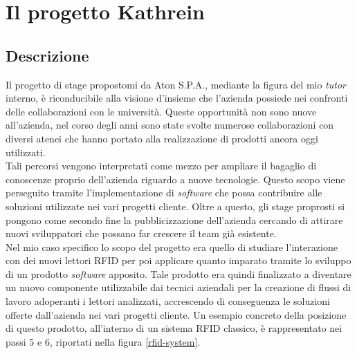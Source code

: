 
\chapter{Il progetto Kathrein}
\label{cap:lo-stage}


\section{Descrizione}
\label{sec:descrizione}
Il progetto di stage propostomi da Aton S.P.A., mediante la figura del mio \emph{tutor} interno, è riconducibile alla visione d'insieme che l'azienda possiede
nei confronti delle collaborazioni con le università. Queste opportunità non sono nuove all'azienda, nel corso degli anni sono state svolte
numerose collaborazioni con diversi atenei che hanno portato alla realizzazione di prodotti ancora oggi utilizzati. \\
Tali percorsi vengono interpretati come mezzo per ampliare il bagaglio di conoscenze proprio dell'azienda riguardo a nuove tecnologie.
Questo scopo viene perseguito tramite l'implementazione di \emph{software} che possa contribuire alle soluzioni 
utilizzate nei vari progetti cliente. Oltre a questo, gli stage proprosti si pongono come secondo fine la pubblicizzazione dell'azienda 
cercando di attirare nuovi sviluppatori che possano far crescere il team già esistente. \\
Nel mio caso specifico lo scopo del progetto era quello di studiare l'interazione con dei nuovi lettori RFID per poi applicare quanto imparato tramite lo
sviluppo di un prodotto \emph{software} apposito. Tale prodotto era quindi finalizzato a diventare un nuovo componente utilizzabile dai tecnici aziendali per 
la creazione di flussi di lavoro adoperanti i lettori analizzati, accrescendo di conseguenza le soluzioni offerte dall'azienda nei vari progetti cliente.
Un esempio concreto della posizione di questo prodotto, all'interno di un sistema RFID classico, è rappresentato nei passi 5 e 6, riportati nella figura 
\ref{rfid-system}.


